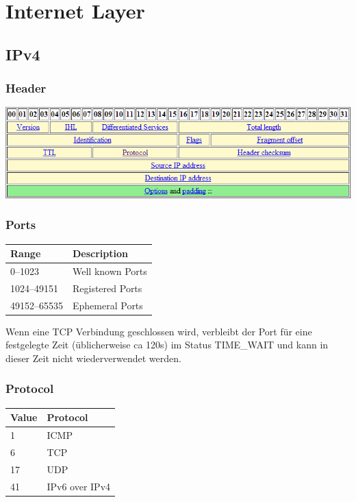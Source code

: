 \section{Internet Layer}


\subsection{IPv4}

\subsubsection{Header}

\includegraphics[width=\textwidth]{media/ipv4_header.png}

\subsubsection{Ports}

\begin{tabular}[h]{|l|l|}
	\hline
  \textbf{Range} & \textbf{Description} \\
	\hline
  0--1023 & Well known Ports \\
  1024--49151 & Registered Ports\\
  49152--65535 & Ephemeral Ports\\
	\hline
\end{tabular}

Wenn eine TCP Verbindung geschlossen wird, verbleibt der Port für eine
festgelegte Zeit (üblicherweise ca 120s) im Status TIME\_WAIT und kann in dieser
Zeit nicht wiederverwendet werden.

\subsubsection{Protocol}

\begin{tabular}[h]{|l|l|}
	\hline
  \textbf{Value} & \textbf{Protocol} \\
	\hline
  1 & ICMP \\
  6 & TCP \\
  17 & UDP \\
  41 & IPv6 over IPv4 \\
	\hline
\end{tabular}


